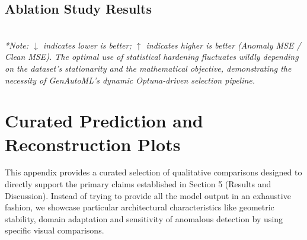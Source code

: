 \documentclass{article}
\begin{document}
\subsection{Ablation Study Results}
\begin{table}[H]
\centering
\caption{Ablation Study: Impact of Dyn-RevIN Across Tasks and Architectures}
\label{tab:comprehensive_ablation}
\vspace{0.1cm} \\
\small{\textit{*Note: $\downarrow$ indicates lower is better; $\uparrow$ indicates higher is better (Anomaly MSE / Clean MSE). The optimal use of statistical hardening fluctuates wildly depending on the dataset's stationarity and the mathematical objective, demonstrating the necessity of GenAutoML's dynamic Optuna-driven selection pipeline.}}
\end{table}


\section{Curated Prediction and Reconstruction Plots}
\label{app:curated_plots}

This appendix provides a curated selection of qualitative comparisons designed to directly support the primary claims established in Section 5 (Results and Discussion). Instead of trying to provide all the model output in an exhaustive fashion, we showcase particular architectural characteristics like geometric stability, domain adaptation and sensitivity of anomalous detection by using specific visual comparisons.
\end{document}
